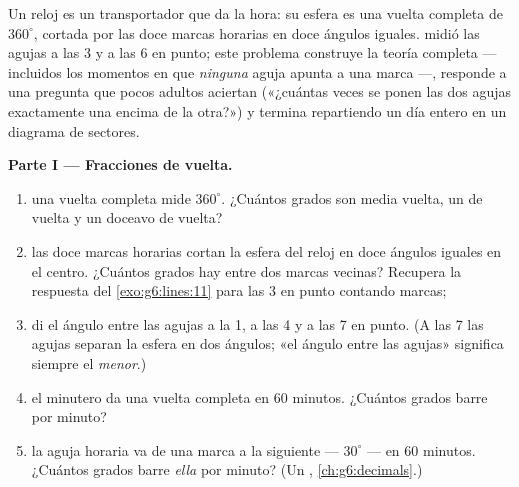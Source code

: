 \begin{problem}
\label{pb:g6:lines:1}
Un reloj es un transportador que da la hora: su esfera es una vuelta
completa de $360^\circ$, cortada por las doce marcas horarias en doce
ángulos iguales.  midió las agujas a las
3 y a las 6 en punto; este problema construye la teoría completa
--- incluidos los momentos en que \emph{ninguna} aguja apunta a una marca ---,
responde a una pregunta que pocos adultos aciertan («¿cuántas veces se ponen
las dos agujas exactamente una encima de la otra?») y termina
repartiendo un día entero en un diagrama de sectores.

\medskip
\noindent\textbf{Parte I --- Fracciones de vuelta.}
\begin{enumerate}
  \item una vuelta completa mide $360^\circ$. ¿Cuántos grados son
        media vuelta, un  de vuelta y un doceavo de vuelta?
  \item las doce marcas horarias cortan la esfera del reloj en doce
        ángulos iguales en el centro. ¿Cuántos grados hay entre dos
        marcas vecinas? Recupera la respuesta del
        \cref{exo:g6:lines:11} para las 3 en punto contando marcas;
  \item di el ángulo entre las agujas a la 1, a las
        4 y a las 7 en punto. (A las 7 las agujas
        separan la esfera en dos ángulos; «el ángulo entre
        las agujas» significa siempre el \emph{menor}.)
  \item el minutero da una vuelta completa en $60$ minutos. ¿Cuántos
        grados barre por minuto?
  \item la aguja horaria va de una marca a la siguiente ---
        $30^\circ$ --- en $60$ minutos. ¿Cuántos grados barre
        \emph{ella} por minuto? (Un ,
        \cref{ch:g6:decimals}.)
\end{enumerate}


\end{problem}
